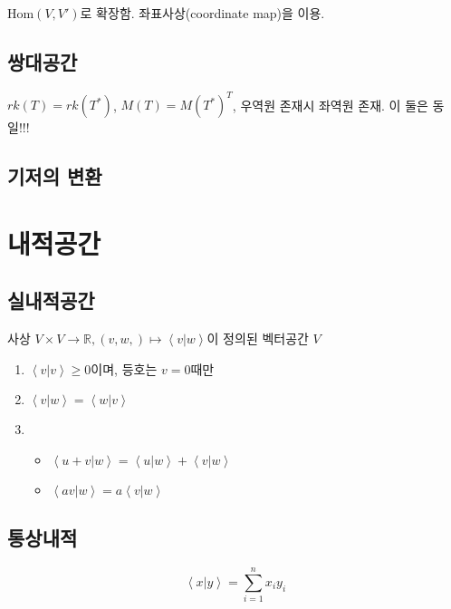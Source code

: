 \documentclass[oneside]{oblivoir}
\begin{document}
$\mathrm{Hom}(V, V')$로 확장함. 좌표사상(coordinate map)을 이용.
\subsection{쌍대공간}
$rk(T)=rk(T^*)$, $M(T) = M(T^*)^T$, 우역원 존재시 좌역원 존재. 이 둘은 동일!!!

\subsection{기저의 변환}


\section{내적공간}
\subsection{실내적공간}
사상 $V \times V \to \mathbb{R}, \left( v, w, \right) \mapsto \left\langle v | w \right\rangle$이 정의된
벡터공간 $V$
\begin{enumerate}
    \item $\left\langle v | v \right\rangle \ge 0 $이며, 등호는 $v=0$때만
    \item $\left\langle v | w \right\rangle = \left\langle w | v \right\rangle$
    \item \begin{itemize}
        \item $\left\langle u+v | w \right\rangle = \left\langle u | w \right\rangle + \left\langle v | w \right\rangle$
        \item $\left\langle av | w \right\rangle = a\left\langle v | w \right\rangle$
    \end{itemize}
\end{enumerate}

\subsection{통상내적}
$$\left\langle x | y \right\rangle = \sum_{i=1}^{n} x_i y_i $$
\end{document}

